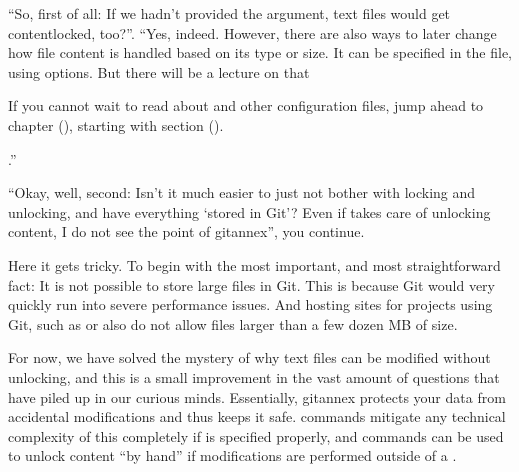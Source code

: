 \sphinxAtStartPar
“So, first of all: If we hadn’t provided the  argument, text files
would get content\sphinxhyphen{}locked, too?”. “Yes, indeed. However, there are also ways to
later change how file content is handled based on its type or size. It can be specified
in the  file, using  options.
But there will be a lecture on that%
\begin{footnote}\sphinxAtStartFootnote
If you cannot wait to read about  and other
configuration files, jump ahead to chapter {\hyperref[\detokenize{basics/basics-configuration:chapter-config}]{}} (),
starting with section {\hyperref[\detokenize{basics/101-122-config:config}]{}} ().
%
\end{footnote}.”

\sphinxAtStartPar
“Okay, well, second: Isn’t it much easier to just not bother with locking and
unlocking, and have everything ‘stored in Git’? Even if  takes care
of unlocking content, I do not see the point of git\sphinxhyphen{}annex”, you continue.

\sphinxAtStartPar
Here it gets tricky. To begin with the most important, and most straight\sphinxhyphen{}forward fact:
It is not possible to store
large files in Git. This is because Git would very quickly run into severe performance
issues. And hosting sites for projects using Git, such as {\hyperref[\detokenize{glossary:term-GitHub}]{}} or {\hyperref[\detokenize{glossary:term-GitLab}]{}}
also do not allow files larger than a few dozen MB of size.

\sphinxAtStartPar
For now, we have solved the mystery of why text files can be modified
without unlocking, and this is a small
improvement in the vast amount of questions that have piled up in our curious
minds. Essentially, git\sphinxhyphen{}annex protects your data from accidental modifications
and thus keeps it safe.  commands mitigate any technical
complexity of this completely if  is specified properly, and
 commands can be used to unlock content “by hand” if
modifications are performed outside of a .

